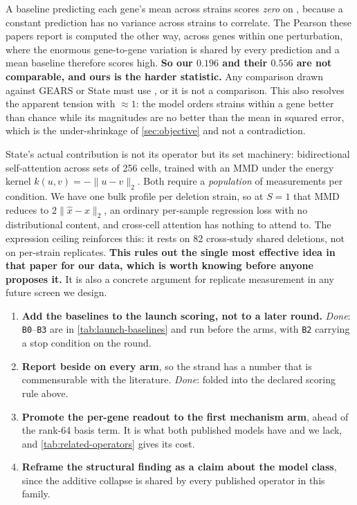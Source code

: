  A baseline predicting
each gene's mean across strains scores \emph{zero} on , because a
constant prediction has no variance across strains to correlate. The Pearson these papers
report is computed the other way, across genes within one perturbation, where the enormous
gene-to-gene variation is shared by every prediction and a mean baseline therefore scores
high. \textbf{So our $0.196$ and their $0.556$ are not comparable, and ours is the harder
statistic.} Any comparison drawn against GEARS or State must use
, or it is not a comparison. This also resolves the apparent
tension with  $\approx 1$: the model orders strains within a gene better than
chance while its magnitudes are no better than the mean in squared error, which is the
under-shrinkage of \cref{sec:objective} and not a contradiction.

 State's actual contribution is
not its operator but its set machinery: bidirectional self-attention across sets of 256
cells, trained with an MMD under the energy kernel $k(u,v) = -\|u - v\|_2$. Both require a
\emph{population} of measurements per condition. We have one bulk profile per deletion
strain, so at $S = 1$ that MMD reduces to $2\|\hat x - x\|_2$, an ordinary per-sample
regression loss with no distributional content, and cross-cell attention has nothing to
attend to. The expression ceiling reinforces this: it rests on 82 cross-study shared
deletions, not on per-strain replicates. \textbf{This rules out the single most effective
idea in that paper for our data, which is worth knowing before anyone proposes it.} It is
also a concrete argument for replicate measurement in any future screen we design.

\begin{enumerate}
\item \textbf{Add the baselines to the launch scoring, not to a later round.} \emph{Done}:
  \texttt{B0}--\texttt{B3} are in \cref{tab:launch-baselines} and run before the arms, with
  \texttt{B2} carrying a stop condition on the round.
\item \textbf{Report  beside  on every
  arm}, so the strand has a number that is commensurable with the literature. \emph{Done}:
  folded into the declared scoring rule above.
\item \textbf{Promote the per-gene readout to the first mechanism arm}, ahead of the
  rank-64 basis term. It is what both published models have and we lack, and
  \cref{tab:related-operators} gives its cost.
\item \textbf{Reframe the structural finding as a claim about the model class}, since the
  additive collapse is shared by every published operator in this family.
\end{enumerate}


